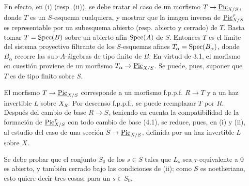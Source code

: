 En efecto, en (i) (resp. (ii)), se debe tratar el caso de un morfismo
\(T\to\underline{\operatorname{Pic}}_{X/S}\), donde \(T\) es un \(S\)-esquema cualquiera,
y mostrar que la imagen inversa de \(\underline{\operatorname{Pic}}^\tau_{X/S}\) es
representable por un subesquema abierto (resp. abierto y cerrado) de \(T\).
Basta tomar \(T=\operatorname{Spec}(B)\) sobre un abierto afín \(\operatorname{Spec}(A)\) de \(S\).
Entonces \(T\) es el límite del sistema proyectivo filtrante de los
\(S\)-esquemas afines \(T_\alpha=\operatorname{Spec}(B_\alpha)\), donde \(B_\alpha\) recorre
las sub-\(A\)-álgebras de tipo finito de \(B\). En virtud de 3.1, el morfismo
en cuestión proviene de un morfismo
\(T_\alpha\to\underline{\operatorname{Pic}}_{X/S}\). Se puede, pues, suponer que \(T\) es de
tipo finito sobre \(S\).

El morfismo \(T\to\underline{\operatorname{Pic}}_{X/S}\) corresponde a un morfismo
f.p.p.f. \(R\to T\) y a un haz invertible \(L\) sobre \(X_R\). Por descenso
f.p.p.f., se puede reemplazar \(T\) por \(R\). Después del cambio de base
\(R\to S\), teniendo en cuenta la compatibilidad de la formación de
\(\underline{\operatorname{Pic}}^\tau_{X/S}\) con todo cambio de base (4.1), se reduce, pues,
en (i) y (ii), al estudio del caso de una sección
\(S\to\underline{\operatorname{Pic}}_{X/S}\), definida por un haz invertible \(L\) sobre
\(X\).

Se debe probar que el conjunto \(S_0\) de los \(s\in S\) tales que \(L_s\)
sea \(\tau\)-equivalente a \(0\) es abierto, y también cerrado bajo las
condiciones de (ii); como \(S\) es noetheriano, esto quiere decir tres cosas:
para un \(s\in S_0\),
